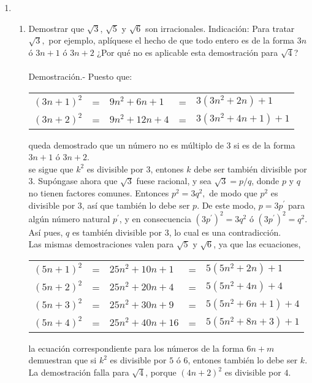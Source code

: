 \begin{enumerate}[\bfseries 1.]
      \item 
      \begin{enumerate}[\bfseries a)]
      \item Demostrar que $\sqrt{3}$, $\sqrt{5}$ y $\sqrt{6}$ son irracionales. Indicación: Para tratar $\sqrt{3},$ por ejemplo, aplíquese el hecho de que todo entero es de la forma $3n$ ó $3n+1$ ó $3n+2$ ¿Por qué no es aplicable esta demostración para $\sqrt{4}$?\\\\
      Demostración.- \; Puesto que:
      \begin{center}
      \begin{tabular}{r c l c l}
      $(3n+1)^2$&=&$9n^2 + 6n + 1$&=&$3(3n^2+2n) + 1$\\
      $(3n+2)^2$&=&$9n^2+12n + 4$&=&$3(3n^2 + 4n + 1) + 1$\\
      \end{tabular}
      \end{center}
      queda demostrado que un número no es múltiplo de $3$ si es de la forma $3n+1$ ó $3n+2$.\\
      se sigue que $k^2$ es divisible por $3$, entones $k$ debe ser también divisible por $3$. Supóngase ahora que $\sqrt{3}$ fuese racional, y sea $\sqrt{3} = p/q$, donde $p$ \; y \; $q$ no tienen factores comunes. Entonces $p^2=3q^2,$ de modo que $p^2$ es divisible por $3$, así que también lo debe ser $p$. De este modo, $p=3p^{'}$ para algún número natural $p^{'}$, y en consecuencia $(3p^{'})^2 = 3q^2$ ó $(3p^{'})^2 = q^2.$ Así pues, $q$ es también divisible por $3$, lo cual es una contradicción.\\
      Las mismas demostraciones valen para $\sqrt{5}$ y $\sqrt{6}$, ya que las ecuaciones,
      \begin{center}
      \begin{tabular}{rclcl}
      $(5n+1)^2$&=&$25n^2 + 10n + 1$&=&$5(5n^2 + 2n)+1$\\
      $(5n+2)^2$&=&$25n^2 + 20n + 4$&=&$5(5n^2 + 4n)+4$\\
      $(5n+3)^2$&=&$25n^2 + 30n + 9$&=&$5(5n^2 + 6n + 1)+4$\\
      $(5n+4)^2$&=&$25n^2 + 40n + 16$&=&$5(5n^2+8n+3)+1$\\
      \end{tabular}
      \end{center}
      la ecuación correspondiente para los números de la forma $6n+m$ demuestran que si $k^2$ es divisible por $5$ ó $6$, entones también lo debe ser $k$. La demostración falla para $\sqrt{4}$, porque $(4n+2)^2$ es divisible por $4$.\\\\


\end{enumerate}
\end{enumerate}
